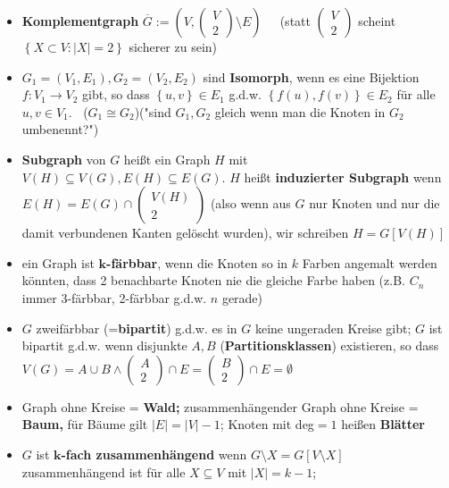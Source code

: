 \documentclass[10pt,a4paper]{article}
\begin{document}
\begin{itemize}
\item \textbf{Komplementgraph} $\overline{G}:=\left(V,\begin{pmatrix}
V\\2
\end{pmatrix}\setminus E \right)\;\;\;\;$  (statt $\begin{pmatrix} V\\2 \end{pmatrix}$ scheint $\left\lbrace X \subset V : \vert X \vert=2\right\rbrace$ sicherer zu sein)
\item $G_{1}=(V_{1},E_{1}), G_{2}=(V_{2},E_{2})$ sind \textbf{Isomorph}, wenn es eine Bijektion $f:V_{1}\rightarrow V_{2}$ gibt, so dass $\left\lbrace u,v\right\rbrace \in E_{1}$ g.d.w. $\left\lbrace f(u),f(v)\right\rbrace \in E_{2}$ für alle $u,v\in V_{1}.\;\;$ ($G_{1}\cong G_{2}$)("sind $G_{1},G_{2}$ gleich wenn man die Knoten in $G_{2}$ umbenennt?")
\item \textbf{Subgraph} von $G$ heißt ein Graph $H$ mit $V(H)\subseteq V(G),E(H)\subseteq E(G)$. $H$ heißt \textbf{induzierter Subgraph} wenn $E(H)=E(G)\cap \begin{pmatrix} V(H)\\2\end{pmatrix}$ (also wenn aus $G$ nur Knoten und nur die damit verbundenen Kanten gelöscht wurden), wir schreiben $H=G[V(H)]$
\item ein Graph ist \textbf{$\boldsymbol{k}$-färbbar}, wenn die Knoten so in $k$ Farben angemalt werden könnten, dass 2 benachbarte Knoten nie die gleiche Farbe haben (z.B. $C_{n}$ immer 3-färbbar, 2-färbbar g.d.w. $n$ gerade)
\item $G$ zweifärbbar (=\textbf{bipartit}) g.d.w. es in $G$ keine ungeraden Kreise gibt; $G$ ist bipartit g.d.w. wenn disjunkte $A,B$ (\textbf{Partitionsklassen}) existieren, so dass $V(G)=A\cup B\land \begin{pmatrix} A\\2\end{pmatrix}\cap E= \begin{pmatrix} B\\2\end{pmatrix}\cap E =\emptyset$
\item Graph ohne Kreise = \textbf{Wald;} zusammenhängender Graph ohne Kreise = \textbf{Baum,} für Bäume gilt $\vert E \vert =\vert V\vert -1$; Knoten mit deg$=1$ heißen \textbf{Blätter}
\item $G$ ist $\boldsymbol{k}$\textbf{-fach zusammenhängend} wenn $G\setminus X=G[V\setminus X]$ zusammenhängend ist für alle $X\subseteq V$ mit $\vert X\vert=k -1$;\\ 

\end{itemize}
\end{document}
